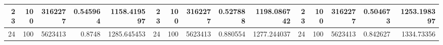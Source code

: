 \begin{table}[htbp]
\begin{tabular}{|r|r|r|r|r|r|r|r|r|r|r|r|r|r|r|}
		\midrule
		23                                & 100                             & 3162277                         & 0.545964                           & 1158.419597                          & 23                               & 100                             & 3162277                         & 0.527888                           & 1198.086742                          & 23 & 100   & 3162277 & 0.504673 & 1253.198397 \\
		\midrule
		24                                & 100                             & 5623413                         & 0.8748                             & 1285.645453                          & 24                               & 100                             & 5623413                         & 0.880554                           & 1277.244037                          & 24 & 100   & 5623413 & 0.842627 & 1334.73356  \\
		\bottomrule
	\end{tabular}%
	\label{tab:addlabel}%
\end{table}%
